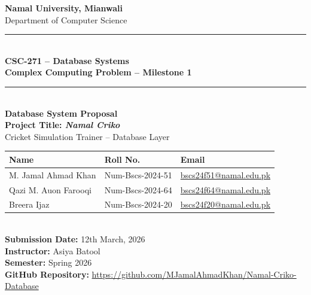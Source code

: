 \documentclass[12pt,a4paper]{article}
\begin{document}
\begin{titlepage}
    \centering
    \vspace*{0.5cm}

    {\LARGE\bfseries Namal University, Mianwali}\\[0.3cm]
    {\large Department of Computer Science}\\[0.8cm]
    \rule{\linewidth}{1pt}\\[0.4cm]
    {\large\bfseries CSC-271 -- Database Systems}\\
    {\large\bfseries Complex Computing Problem -- Milestone 1}\\[0.4cm]
    \rule{\linewidth}{1pt}\\[1.2cm]

    {\Huge\bfseries Database System Proposal}\\[0.5cm]
    {\large\bfseries Project Title: \textit{Namal Criko}}\\[0.3cm]
    {\large Cricket Simulation Trainer -- Database Layer}\\[1.5cm]

    \begin{tabular}{lll}
        \toprule
        \textbf{Name} & \textbf{Roll No.} & \textbf{Email} \\
        \midrule
        M. Jamal Ahmad Khan      & Num-Bscs-2024-51 & \href{mailto:bscs24f51@namal.edu.pk}{bscs24f51@namal.edu.pk} \\
        Qazi M. Auon Farooqi     & Num-Bscs-2024-64 & \href{mailto:bscs24f64@namal.edu.pk}{bscs24f64@namal.edu.pk} \\
        Breera Ijaz              & Num-Bscs-2024-20 & \href{mailto:bscs24f20@namal.edu.pk}{bscs24f20@namal.edu.pk} \\
        \bottomrule
    \end{tabular}\\[1.5cm]

    \textbf{Submission Date:} 12th March, 2026\\[0.3cm]
    \textbf{Instructor:} Asiya Batool\\[0.3cm]
    \textbf{Semester:} Spring 2026\\[0.3cm]
    \textbf{GitHub Repository:} \url{https://github.com/MJamalAhmadKhan/Namal-Criko-Database}
    \vfill
\end{titlepage}

\tableofcontents
\newpage

\end{document}
